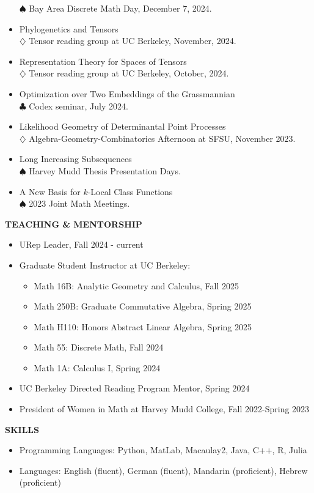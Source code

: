 \documentclass[11pt]{article}
\newcommand{\hdr}[1]{\textcolor{blue(ryb)}{\textbf{#1}}}
\begin{document}
\begin{itemize}
  $\spadesuit$ Bay Area Discrete Math Day, December 7, 2024. 
\item Phylogenetics and Tensors\\
  $\diamondsuit$ Tensor reading group at UC Berkeley, November, 2024. 
\item Representation Theory for Spaces of Tensors\\
  $\diamondsuit$ Tensor reading group at UC Berkeley, October, 2024. 
\item Optimization over Two Embeddings of the Grassmannian\\
  $\clubsuit$ Codex seminar, July 2024. 
\item Likelihood Geometry of Determinantal Point Processes\\
  $\diamondsuit$ Algebra-Geometry-Combinatorics Afternoon at SFSU, November 2023.
\item Long Increasing Subsequences\\
  $\spadesuit$ Harvey Mudd Thesis Presentation Days.
\item A New Basis for $k$-Local Class Functions\\
  $\spadesuit$ 2023 Joint Math Meetings.
\end{itemize}

\bigskip


\hdr{TEACHING \& MENTORSHIP}\\
\begin{itemize}
\item URep Leader, Fall 2024 - current
\item Graduate Student Instructor at UC Berkeley:
  \begin{itemize}
  \item Math 16B: Analytic Geometry and Calculus, Fall 2025
  \item Math 250B: Graduate Commutative Algebra, Spring 2025
  \item Math H110: Honors Abstract Linear Algebra, Spring 2025
  \item Math 55: Discrete Math, Fall 2024
  \item Math 1A: Calculus I, Spring 2024
  \end{itemize}
\item UC Berkeley Directed Reading Program Mentor, Spring 2024
\item President of Women in Math at Harvey Mudd College, Fall 2022-Spring 2023
\end{itemize}

\bigskip

\hdr{SKILLS}\\
\begin{itemize}
\item 
Programming Languages: Python, MatLab, Macaulay2, Java, C++, R, Julia\\
\item 
Languages: English (fluent), German (fluent), Mandarin (proficient), Hebrew (proficient)
\end{itemize}
\end{document}
